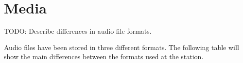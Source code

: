 % 

\chapter{Media}
TODO: Describe differences in audio file formats.


Audio files have been stored in three different formats. The following
table will show the main differences between the formats used at the
station.


